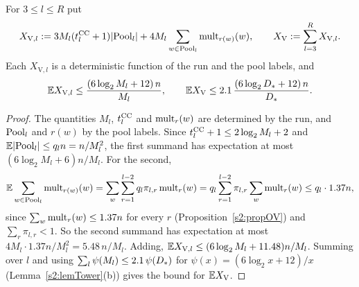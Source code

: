 \begin{lemma}\label{s7:lemVstar}
For $3\le l\le R$ put
\[
X_{\mathrm{V},l}\mathrel{:=}3M_l(t^{\mathrm{CC}}_l+1)|\mathrm{Pool}_l|+4M_l\sum_{w\in\mathrm{Pool}_l}\mathrm{mult}_{r(w)}(w),
\qquad X_{\mathrm{V}}\mathrel{:=}\sum_{l=3}^{R}X_{\mathrm{V},l}.
\]
Each $X_{\mathrm{V},l}$ is a deterministic function of the run and the pool
labels, and
\[
\mathbb{E} X_{\mathrm{V},l}\le\frac{(6\log_2M_l+12)\,n}{M_l},\qquad
\mathbb{E}X_{\mathrm{V}}\le2.1\,\frac{(6\log_2D_{*}+12)\,n}{D_{*}}.
\]
\deps{\ref{s7:defPool}, \ref{s2:propOV}, \ref{s2:lemTower}}
\end{lemma}

\begin{proof}
The quantities $M_l$, $t^{\mathrm{CC}}_l$ and $\mathrm{mult}_r(w)$ are determined by the run, and
$\mathrm{Pool}_l$ and $r(w)$ by the pool labels. Since $t^{\mathrm{CC}}_l+1\le2\log_2M_l+2$ and
$\mathbb{E}|\mathrm{Pool}_l|\le q_ln=n/M_l^2$, the first summand has expectation at most
$(6\log_2M_l+6)n/M_l$. For the second,
\[
\mathbb{E}\sum_{w\in\mathrm{Pool}_l}\mathrm{mult}_{r(w)}(w)=\sum_{w}\sum_{r=1}^{l-2}q_l\pi_{l,r}\,\mathrm{mult}_r(w)
=q_l\sum_{r=1}^{l-2}\pi_{l,r}\sum_w\mathrm{mult}_r(w)\le q_l\cdot1.37n ,
\]
since $\sum_w\mathrm{mult}_r(w)\le1.37n$ for every $r$ (Proposition~\ref{s2:propOV}) and
$\sum_r\pi_{l,r}<1$. So the second summand has expectation at most
$4M_l\cdot1.37n/M_l^2=5.48\,n/M_l$. Adding, $\mathbb{E} X_{\mathrm{V},l}\le(6\log_2M_l+11.48)n/M_l$.
Summing over $l$ and using $\sum_l\psi(M_l)\le2.1\,\psi(D_{*})$ for
$\psi(x)=(6\log_2x+12)/x$ (Lemma~\ref{s2:lemTower}(b)) gives the bound for
$\mathbb{E}X_{\mathrm{V}}$.
\end{proof}

